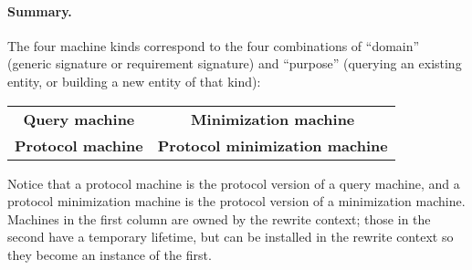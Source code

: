 \documentclass[../generics]{subfiles}
\begin{document}
\paragraph{Summary.}
The four machine kinds correspond to the four combinations of ``domain'' (generic signature or requirement signature) and ``purpose'' (querying an existing entity, or building a new entity of that kind):
\begin{center}
\begin{tabular}{cc}
\toprule
\textbf{Query machine}&\textbf{Minimization machine}\\
\textbf{Protocol machine}&\textbf{Protocol minimization machine}\\
\bottomrule
\end{tabular}
\end{center}
Notice that a protocol machine is the protocol version of a query machine, and a protocol minimization machine is the protocol version of a minimization machine. Machines in the first column are owned by the rewrite context; those in the second have a temporary lifetime, but can be installed in the rewrite context so they become an instance of the first.
\end{document}
